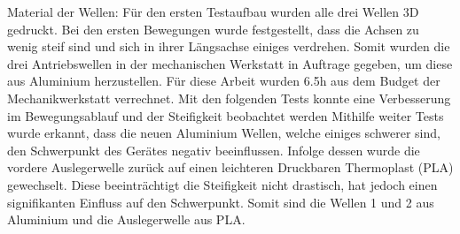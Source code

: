 Material der Wellen:
Für den ersten Testaufbau wurden alle drei Wellen 3D gedruckt. Bei den ersten Bewegungen wurde festgestellt, dass die Achsen zu wenig steif sind und sich in ihrer Längsachse einiges verdrehen.
Somit wurden die drei Antriebswellen in der mechanischen Werkstatt in Auftrage gegeben, um diese aus Aluminium herzustellen. Für diese Arbeit wurden 6.5h aus dem Budget der Mechanikwerkstatt verrechnet.
Mit den folgenden Tests konnte eine Verbesserung im Bewegungsablauf und der Steifigkeit beobachtet werden
Mithilfe weiter Tests wurde erkannt, dass die neuen Aluminium Wellen, welche einiges schwerer sind, den Schwerpunkt des Gerätes negativ beeinflussen. Infolge dessen wurde die vordere Auslegerwelle zurück auf einen leichteren Druckbaren Thermoplast (PLA) gewechselt. Diese beeinträchtigt die Steifigkeit nicht drastisch, hat jedoch einen signifikanten Einfluss auf den Schwerpunkt.
Somit sind die Wellen 1 und 2 aus Aluminium und die Auslegerwelle aus PLA.


